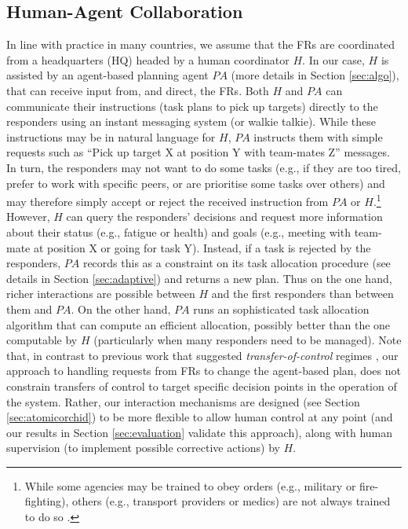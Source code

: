 %
\subsection{Human-Agent Collaboration}
\noindent In line with practice in many countries, we assume that the FRs are coordinated from a headquarters (HQ) headed by a human coordinator $H$. In our case, $H$ is assisted by an agent-based planning agent $PA$ (more details in Section \ref{sec:algo}), that can receive input from, and direct, the FRs.   Both  $H$ and $PA$  can communicate their  instructions (task plans to pick up targets) directly to the responders using an instant messaging system (or walkie talkie).  While these instructions may be in natural language for $H$, $PA$ instructs them with simple requests such as ``Pick up target X at position Y with team-mates Z'' messages. In turn, the responders may not want to do some tasks (e.g., if they are too tired, prefer to work with specific  peers, or are prioritise some tasks over others) and may therefore simply accept or reject the received instruction from $PA$ or $H$.\footnote{While some agencies may be trained to obey orders (e.g., military or fire-fighting), others (e.g., transport providers or medics) are not  always trained to do so \cite{UNOCHA}.} However, $H$ can query the responders' decisions and request  more information about their status (e.g., fatigue or health) and goals (e.g., meeting with team-mate at position X or going for task Y). Instead, if a task is rejected by the responders, $PA$ records this as a constraint on its task allocation procedure (see details in Section \ref{sec:adaptive}) and returns a new plan. Thus on the one hand, richer interactions are possible between $H$ and the first responders than between them and $PA$. On the other hand, $PA$ runs an sophisticated task allocation algorithm that can compute an efficient allocation, possibly better than the one computable by $H$ (particularly when many responders need to be managed). Note that, in contrast to previous work that suggested \emph{transfer-of-control} regimes \cite{scerri:etal:2005}, our approach to handling requests from FRs to change the agent-based plan, does not constrain transfers of control to target specific decision points in the operation of the system. Rather, our interaction mechanisms are designed (see Section \ref{sec:atomicorchid}) to be more flexible to allow human control at any point (and our results  in Section \ref{sec:evaluation} validate this approach), along with human supervision (to implement possible corrective actions) by $H$.


